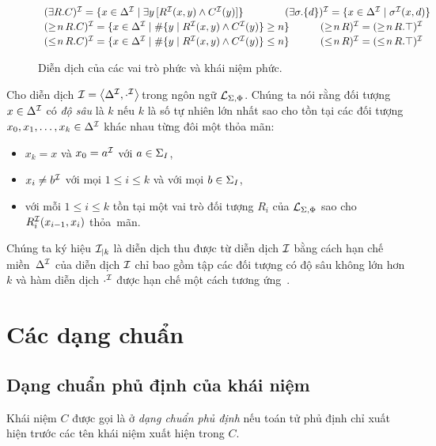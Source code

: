 \begin{figure}
{\[\begin{array}{l}
%
		(\E R.C)^\mI = \{ x \in \Delta^\mI \mid \E y\,[R^\mI(x,y) \wedge C^\mI(y)]\}\qquad\qquad (\E \sigma.\{d\})^\mI = \{ x \in \Delta^\mI \mid \sigma^\mI(x,d)\} \\[0.5ex]
%
		(\geq\!n\,R.C)^\mI = \{x \in \Delta^\mI \mid \#\{y \mid R^\mI(x,y) \wedge C^\mI(y)\} \geq n\} \qquad\quad (\geq\!n\,R)^\mI = (\geq\!n\,R.\top)^\mI \\[0.5ex]
%
		(\leq\!n\,R.C)^\mI = \{x \in \Delta^\mI \mid \#\{y \mid R^\mI(x,y) \wedge C^\mI(y)\} \leq n \} \qquad\quad (\leq\!n\,R)^\mI = (\leq\!n\,R.\top)^\mI
	\end{array}
	\vspace{-2.5ex}
	\]}
\caption{Diễn dịch của các vai trò phức và khái niệm phức.\label{fig:LSPInterpretation}}
\end{figure}

Cho diễn dịch $\mathcal{I} = \left\langle\Delta^{\mathcal{I}}, \cdot^{\mathcal{I}}\right\rangle\!$ trong ngôn ngữ $\mathcal{L}_{\Sigma,\Phi}$. Chúng ta nói rằng đối tượng $x \in \Delta^{\mathcal{I}}$ có {\em độ sâu} là $k$ nếu $k$ là số tự nhiên lớn nhất sao cho tồn tại các đối tượng $x_0, x_1, \ldots, x_k \in \Delta^{\mathcal{I}}$ khác nhau từng đôi một thỏa mãn:
\begin{itemize}
	\item $x_k = x$ và $x_0 = a^{\mathcal{I}}$ với $a \in \Sigma_I$,
	\item $x_i \not= b^{\mathcal{I}}$ với mọi $1 \leq i \leq k$ và với mọi $b \in \Sigma_I$,
	\item với mỗi $1 \leq i \leq k$ tồn tại một vai trò đối tượng $R_i$ của $\mathcal{L}_{\Sigma,\Phi}$ sao cho $R_i^{\mathcal{I}}(x_{i-1}, x_i)$ thỏa~mãn.
\end{itemize}

Chúng ta ký hiệu $\mathcal{I}_{\mid k}$ là diễn dịch thu được từ diễn dịch $\mathcal{I}$ bằng cách hạn chế miền~$\Delta^{\mathcal{I}}$ của diễn dịch $\mathcal{I}$ chỉ bao gồm tập các đối tượng có độ sâu không lớn hơn $k$ và hàm diễn dịch $\cdot^{\mathcal{I}}$ được hạn chế một cách tương ứng~\cite{Ha2012}.
\section{Các dạng chuẩn}
\label{sec:Chap1.NormalForms}

\subsection{Dạng chuẩn phủ định của khái niệm}
\label{sec:Chap1.NegationNormalForm}
Khái niệm $C$ được gọi là ở {\em dạng chuẩn phủ định} nếu toán tử phủ định chỉ xuất hiện trước các tên khái niệm xuất hiện trong $C$.

